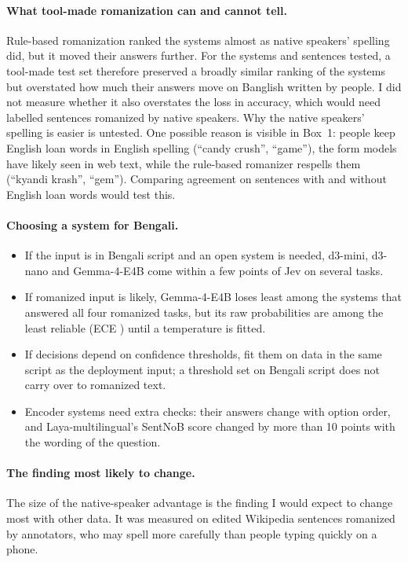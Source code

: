 \documentclass[11pt]{article}
\begin{document}
\paragraph{What tool-made romanization can and cannot tell.}
Rule-based romanization ranked the systems almost as native speakers' spelling did, but it moved their answers further.
For the systems and sentences tested, a tool-made test set therefore preserved a broadly similar ranking of the systems but overstated how much their answers move on Banglish written by people.
I did not measure whether it also overstates the loss in accuracy, which would need labelled sentences romanized by native speakers.
Why the native speakers' spelling is easier is untested.
One possible reason is visible in Box~1: people keep English loan words in English spelling (``candy crush'', ``game''), the form models have likely seen in web text, while the rule-based romanizer respells them (``kyandi krash'', ``gem'').
Comparing agreement on sentences with and without English loan words would test this.

\paragraph{Choosing a system for Bengali.}
\begin{itemize}
\item If the input is in Bengali script and an open system is needed, d3-mini, d3-nano and Gemma-4-E4B come within a few points of Jev on several tasks.
\item If romanized input is likely, Gemma-4-E4B loses least among the systems that answered all four romanized tasks, but its raw probabilities are among the least reliable (ECE \ecegemmaNatRaw) until a temperature is fitted.
\item If decisions depend on confidence thresholds, fit them on data in the same script as the deployment input; a threshold set on Bengali script does not carry over to romanized text.
\item Encoder systems need extra checks: their answers change with option order, and Laya-multilingual's SentNoB score changed by more than 10 points with the wording of the question.
\end{itemize}

\paragraph{The finding most likely to change.}
The size of the native-speaker advantage is the finding I would expect to change most with other data.
It was measured on edited Wikipedia sentences romanized by annotators, who may spell more carefully than people typing quickly on a phone.
\end{document}
